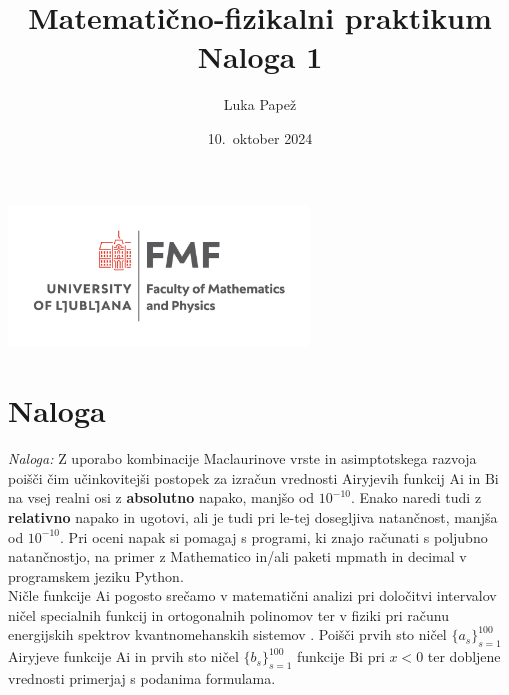 \documentclass{article}
\newcommand{\Ai}{\mathrm{Ai}}
\newcommand{\Bi}{\mathrm{Bi}}
\begin{document}
\title{Matematično-fizikalni praktikum \\[3mm] \large Naloga 1}
\author{Luka Papež}
\date{10.\ oktober 2024}

\begin{center}
    \includegraphics[width=8cm]{logo-fmf.png}
\end{center}

{
    \let\newpage\relax
    \maketitle
}

\maketitle
\newpage
\section{Naloga}
{\sl Naloga:} Z uporabo kombinacije Maclaurinove vrste in asimptotskega
razvoja poišči čim učinkovitejši postopek za izračun
vrednosti Airyjevih funkcij $\Ai$ in $\Bi$ na vsej real\-ni osi
z {\bf absolutno} napako, manjšo od $10^{-10}$. Enako naredi tudi z {\bf relativno} napako in ugotovi,
ali je tudi pri le-tej dosegljiva natančnost, manjša od $10^{-10}$.
Pri oceni napak si po\-ma\-gaj s programi, ki znajo računati s poljubno
natančnostjo, na primer z {\sc Mathematico} in/ali paketi {\sc mpmath} in {\sc decimal} v programskem
jeziku {\sc Python}. \\ 

 Ničle funkcije $\Ai$ pogosto srečamo v matematični
analizi pri določitvi intervalov ničel specialnih funkcij
in ortogonalnih polinomov \cite{1_szego} ter v fiziki pri računu
energijskih spektrov kvantnomehanskih sistemov \cite{1_landauQM}.
Poišči prvih sto ničel $\{a_s\}_{s=1}^{100}$ Airyjeve
funkcije $\Ai$ in prvih sto ničel $\{b_s\}_{s=1}^{100}$
funkcije $\Bi$ pri $x<0$ ter dobljene vrednosti primerjaj s podanima formulama.
\end{document}
